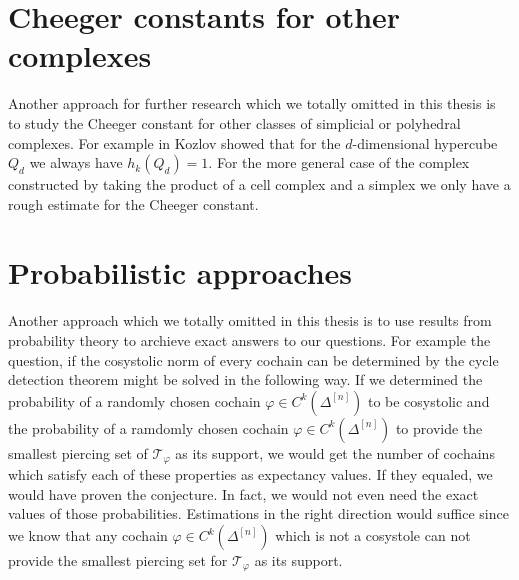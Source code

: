 \section{Cheeger constants for other complexes}

Another approach for further research which we totally omitted in this thesis is to study the Cheeger constant for other classes of simplicial or polyhedral complexes. For example in \cite{6} Kozlov showed that for the \(d\)-dimensional hypercube \(Q_d\) we always have \(h_k(Q_d)=1\). For the more general case of the complex constructed by taking the product of a cell complex and a simplex we only have a rough estimate for the Cheeger constant.

\section{Probabilistic approaches}

Another approach which we totally omitted in this thesis is to use results from probability theory to archieve exact answers to our questions. For example the question, if the cosystolic norm of every cochain can be determined by the cycle detection theorem might be solved in the following way. If we determined the probability of a randomly chosen cochain \(\varphi\in C^k(\Delta^{[n]})\) to be cosystolic and the probability of a ramdomly chosen cochain \(\varphi\in C^k(\Delta^{[n]})\) to provide the smallest piercing set of \(\mathcal{T}_{\varphi}\) as its support, we would get the number of cochains which satisfy each of these properties as expectancy values. If they equaled, we would have proven the conjecture. In fact, we would not even need the exact values of those probabilities. Estimations in the right direction would suffice since we know that any cochain \(\varphi\in C^k(\Delta^{[n]})\) which is not a cosystole can not provide the smallest piercing set for \(\mathcal{T}_{\varphi}\) as its support.